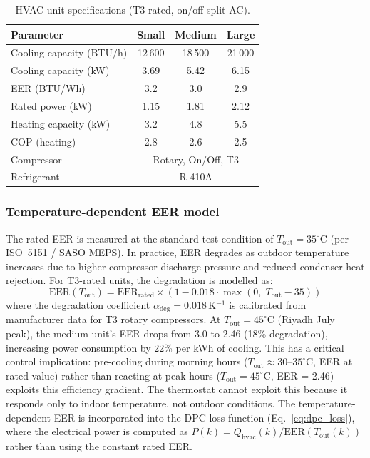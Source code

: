 \documentclass[12pt]{article}
\theoremstyle{plain}
\theoremstyle{definition}
\begin{document}
\begin{table}[H]
\centering
\caption{HVAC unit specifications (T3-rated, on/off split AC).}\label{tab:hvac_units}

\begin{tabular*}{\textwidth}{@{\extracolsep{\fill}}lccc}
\toprule
Parameter & Small & Medium & Large \\
\midrule
Cooling capacity (BTU/h) & 12\,600 & 18\,500 & 21\,000 \\
Cooling capacity (kW) & 3.69 & 5.42 & 6.15 \\
EER (BTU/Wh) & 3.2 & 3.0 & 2.9 \\
Rated power (kW) & 1.15 & 1.81 & 2.12 \\
Heating capacity (kW) & 3.2 & 4.8 & 5.5 \\
COP (heating) & 2.8 & 2.6 & 2.5 \\
Compressor & \multicolumn{3}{c}{Rotary, On/Off, T3} \\
Refrigerant & \multicolumn{3}{c}{R-410A} \\
\bottomrule
\end{tabular*}
\end{table}

\subsubsection{Temperature-dependent EER model}

The rated EER is measured at the standard test condition of $T_{\text{out}} = 35^\circ$C (per ISO~5151 / SASO MEPS). In practice, EER degrades as outdoor temperature increases due to higher compressor discharge pressure and reduced condenser heat rejection. For T3-rated units, the degradation is modelled as:
\begin{equation}\label{eq:eer_degrade}
\text{EER}(T_{\text{out}}) = \text{EER}_{\text{rated}} \times \left(1 - 0.018 \cdot \max(0,\; T_{\text{out}} - 35)\right)
\end{equation}
where the degradation coefficient $\alpha_{\text{deg}} = 0.018$\,K$^{-1}$ is calibrated from manufacturer data for T3 rotary compressors. At $T_{\text{out}} = 45^\circ$C (Riyadh July peak), the medium unit's EER drops from 3.0 to 2.46 (18\% degradation), increasing power consumption by 22\% per kWh of cooling. This has a critical control implication: pre-cooling during morning hours ($T_{\text{out}} \approx 30$--$35^\circ$C, EER at rated value) rather than reacting at peak hours ($T_{\text{out}} = 45^\circ$C, EER = 2.46) exploits this efficiency gradient. The thermostat cannot exploit this because it responds only to indoor temperature, not outdoor conditions. The temperature-dependent EER is incorporated into the DPC loss function (Eq.~\ref{eq:dpc_loss}), where the electrical power is computed as $P(k) = Q_{\text{hvac}}(k) / \text{EER}(T_{\text{out}}(k))$ rather than using the constant rated EER.
\end{document}
